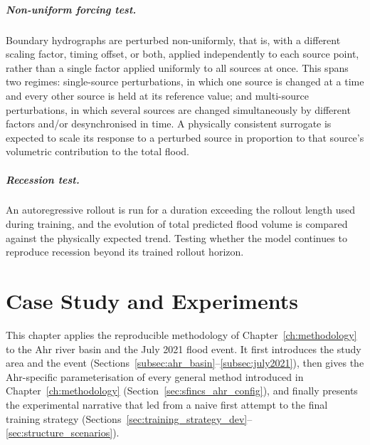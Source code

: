 \documentclass[12pt,a4paper]{report}
\begin{document}
 \paragraph{Non-uniform forcing test.} Boundary hydrographs are perturbed non-uniformly, that is, with a different scaling factor, timing offset, or both, applied independently to each source point, rather than a single factor applied uniformly to all sources at once. This spans two regimes: single-source perturbations, in which one source is changed at a time and every other source is held at its reference value; and multi-source perturbations, in which several sources are changed simultaneously by different factors and/or desynchronised in time. A physically consistent surrogate is expected to scale its response to a perturbed source in proportion to that source's volumetric contribution to the total flood.
 
 
\paragraph{Recession test.} An autoregressive rollout is run for a duration exceeding
the rollout length used during training, and the evolution of total predicted flood
volume is compared against the physically expected trend. 
Testing whether the model continues to reproduce recession beyond its
trained rollout horizon.
 
 

\chapter{Case Study and Experiments}
\label{ch:case_study}

This chapter applies the reproducible methodology of Chapter~\ref{ch:methodology} to
the Ahr river basin and the July 2021 flood event. It first introduces the study area
and the event (Sections~\ref{subsec:ahr_basin}--\ref{subsec:july2021}), then gives the
Ahr-specific parameterisation of every general method introduced in
Chapter~\ref{ch:methodology} (Section~\ref{sec:sfincs_ahr_config}), and finally presents
the experimental narrative that led from a naive first attempt to the final training
strategy (Sections~\ref{sec:training_strategy_dev}--\ref{sec:structure_scenarios}). 
\end{document}

